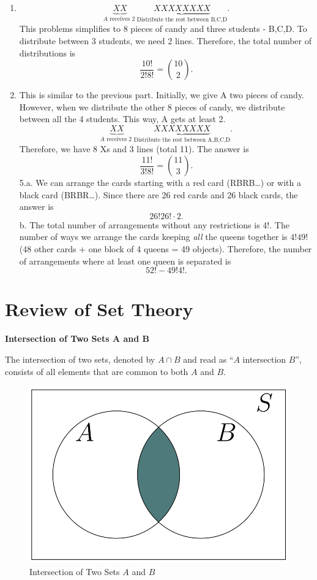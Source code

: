 \documentclass[
  12pt,
]{krantzNoCorner}
\begin{document}
\begin{enumerate}
\def\labelenumi{\alph{enumi}.}
\setcounter{enumi}{1}
\item
  \[\underbrace{XX}_{A\text{ receives 2 
   }}\underbrace{XXXXXXXX}_{\text{Distribute the rest between B,C,D}}.\]
  This problems simplifies to 8 pieces of candy and three students -
  B,C,D. To distribute between 3 students, we need 2 lines. Therefore,
  the total number of distributions is
  \[\frac{10!}{2!8!}=\binom{10}{2}.\]
\item
  This is similar to the previous part. Initially, we give A two
  pieces of candy. However, when we distribute the other 8 pieces of
  candy, we distribute between all the 4 students. This way, A gets at
  least 2. \[\underbrace{XX}_{A\text{ receives 2 
   }}\underbrace{XXXXXXXX}_{\text{Distribute the rest between A,B,C,D}}.\]
  Therefore, we have 8 Xs and 3 lines (total 11). The answer is
  \[\frac{11!}{3!8!}=\binom{11}{3}.\] 5.a. We can arrange the cards
  starting with a red card (RBRB\ldots) or with a black card (BRBR\ldots).
  Since there are 26 red cards and 26 black cards, the answer is
  \[ 26!26!\cdot2.\] b. The total number of arrangements without any
  restrictions is 4!. The number of ways we arrange the cards keeping
  \textit{all} the queens together is \(4!49!\) (48 other cards + one
  block of 4 queens = 49 objects). Therefore, the number of
  arrangements where at least one queen is separated is \[52!-49!4!.\]
\end{enumerate}

\hypertarget{review-of-set-theory}{%
\section{Review of Set Theory}\label{review-of-set-theory}}

\textbf{Intersection of Two Sets A and B}

The intersection of two sets, denoted by \(A \cap B\) and read as ``\(A\)
intersection \(B\)'', consists of all elements that are common to both \(A\)
and \(B\).

\begin{figure}
\includegraphics[width=0.5\linewidth,height=0.4\textheight]{Ven1} \caption{Intersection of Two Sets $A$ and $B$}\label{fig:intersec}
\end{figure}
\end{document}
